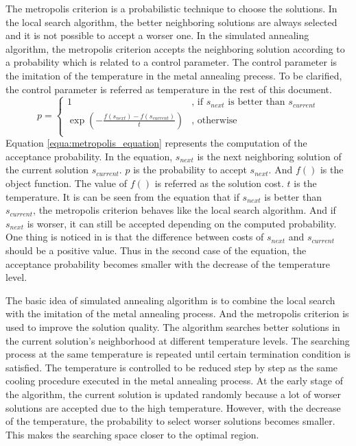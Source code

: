 		The metropolis criterion is a probabilistic technique to choose the solutions.
		In the local search algorithm, the better neighboring solutions are always selected
		and it is not possible to accept a worser one. In the simulated annealing
		algorithm, the metropolis criterion accepts the neighboring solution according to a 
		probability which is related to a control parameter. The control parameter
		is the imitation of the temperature in the metal annealing precess. To be clarified,
		the control parameter is referred as temperature in the rest of this document.
		\begin{equation}
		\label{equa:metropolis_equation}
			p=
				\begin{cases}
					1 & \text{, if } s_{next} \text{ is better than } s_{current}\\
					\exp{\left( -\frac{f(s_{next})-f(s_{current})}{t} \right)} & \text{, otherwise}\\
				\end{cases}
		\end{equation}
		Equation \ref{equa:metropolis_equation} represents the computation of the acceptance
		probability. In the equation, $s_{next}$ is the next neighboring solution of the
		current solution $s_{current}$. $p$ is the probability to accept $s_{next}$.
		And $f()$ is the object function. The value of $f()$ is referred as the
		solution cost. $t$ is the temperature. It is can be seen from the equation
		that if $s_{next}$ is better than $s_{current}$, the metropolis criterion behaves
		like the local search algorithm. And if $s_{next}$ is worser, it can still be accepted
		depending on the computed probability. One thing is noticed in \cite{10.2307/1690046}
		is that the difference between costs of $s_{next}$ and $s_{current}$ should be a
		positive value. Thus in the second case of the equation, the acceptance probability
		becomes smaller with the decrease of the temperature level.
		
		The basic idea of simulated annealing algorithm is to combine the local search
		with the imitation of the metal annealing process. And the metropolis criterion is
		used to improve the solution quality.
		The algorithm searches better solutions in the current solution's neighborhood at 
		different temperature levels.
		The searching process at the same temperature is repeated until certain termination
		condition is satisfied. The temperature is controlled to be reduced step by step
		as the same cooling procedure executed in the metal annealing process. At the early
		stage of the algorithm, the current solution is updated randomly because a lot of
		worser solutions are accepted due to the high temperature. However, with
		the decrease of the temperature, the probability to select worser solutions becomes
		smaller. This makes the searching space closer to the optimal region.
		
